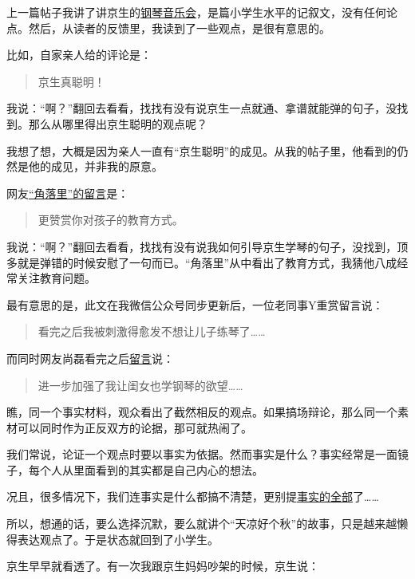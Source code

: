 \documentclass[twoside,openright,headings=optiontohead]{ctexbook} %
\begin{document}
{上一篇帖子我讲了讲京生的\href{http://dapengde.com/archives/19165}{钢琴音乐会}，是篇小学生水平的记叙文，没有任何论点。然后，从读者的反馈里，我读到了一些观点，是很有意思的。

比如，自家亲人给的评论是：

\begin{quote}
京生真聪明！
\end{quote}

我说：``啊？''翻回去看看，找找有没有说京生一点就通、拿谱就能弹的句子，没找到。那么从哪里得出京生聪明的观点呢？

我想了想，大概是因为亲人一直有``京生聪明''的成见。从我的帖子里，他看到的仍然是他的成见，并非我的原意。

网友\href{http://dapengde.com/archives/19165\#comment-150550}{``角落里''的留言}是：

\begin{quote}
更赞赏你对孩子的教育方式。
\end{quote}

我说：``啊？''翻回去看看，找找有没有说我如何引导京生学琴的句子，没找到，顶多就是弹错的时候安慰了一句而已。``角落里''从中看出了教育方式，我猜他八成经常关注教育问题。

最有意思的是，此文在我微信公众号同步更新后，一位老同事Y重赏留言说：

\begin{quote}
看完之后我被刺激得愈发不想让儿子练琴了\ldots{}\ldots{}
\end{quote}

而同时网友尚磊看完之后\href{http://dapengde.com/archives/19165\#comment-150582}{留言}说：

\begin{quote}
进一步加强了我让闺女也学钢琴的欲望\ldots{}\ldots{}
\end{quote}

瞧，同一个事实材料，观众看出了截然相反的观点。如果搞场辩论，那么同一个素材可以同时作为正反双方的论据，那可就热闹了。

我们常说，论证一个观点时要以事实为依据。然而事实是什么？事实经常是一面镜子，每个人从里面看到的其实都是自己内心的想法。

况且，很多情况下，我们连事实是什么都搞不清楚，更别提\href{http://dapengde.com/archives/12956}{事实的全部}了\ldots{}\ldots{}

所以，想通的话，要么选择沉默，要么就讲个``天凉好个秋''的故事，只是越来越懒得表达观点了。于是状态就回到了小学生。

京生早早就看透了。有一次我跟京生妈妈吵架的时候，京生说：

}
\end{document}
